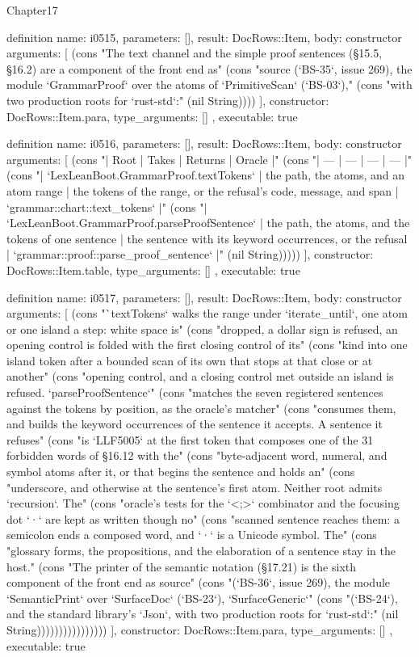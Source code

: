 \begin{lexlean}{Chapter17}
\begin{semanticmodule}
definition{
  name: i0515,
  parameters: [],
  result: DocRows::Item,
  body: constructor{
    arguments: [
      (cons "The text channel and the simple proof sentences (§15.5, §16.2) are a component of the front end as" (cons "source (`BS-35`, issue 269), the module `GrammarProof` over the atoms of `PrimitiveScan` (`BS-03`)," (cons "with two production roots for `rust-std`:" (nil String))))
    ],
    constructor: DocRows::Item.para,
    type_arguments: []
  },
  executable: true
}

definition{
  name: i0516,
  parameters: [],
  result: DocRows::Item,
  body: constructor{
    arguments: [
      (cons "| Root | Takes | Returns | Oracle |" (cons "| --- | --- | --- | --- |" (cons "| `LexLeanBoot.GrammarProof.textTokens` | the path, the atoms, and an atom range | the tokens of the range, or the refusal's code, message, and span | `grammar::chart::text_tokens` |" (cons "| `LexLeanBoot.GrammarProof.parseProofSentence` | the path, the atoms, and the tokens of one sentence | the sentence with its keyword occurrences, or the refusal | `grammar::proof::parse_proof_sentence` |" (nil String)))))
    ],
    constructor: DocRows::Item.table,
    type_arguments: []
  },
  executable: true
}

definition{
  name: i0517,
  parameters: [],
  result: DocRows::Item,
  body: constructor{
    arguments: [
      (cons "`textTokens` walks the range under `iterate_until`, one atom or one island a step: white space is" (cons "dropped, a dollar sign is refused, an opening control is folded with the first closing control of its" (cons "kind into one island token after a bounded scan of its own that stops at that close or at another" (cons "opening control, and a closing control met outside an island is refused. `parseProofSentence`" (cons "matches the seven registered sentences against the tokens by position, as the oracle's matcher" (cons "consumes them, and builds the keyword occurrences of the sentence it accepts. A sentence it refuses" (cons "is `LLF5005` at the first token that composes one of the 31 forbidden words of §16.12 with the" (cons "byte-adjacent word, numeral, and symbol atoms after it, or that begins the sentence and holds an" (cons "underscore, and otherwise at the sentence's first atom. Neither root admits `recursion`. The" (cons "oracle's tests for the `<;>` combinator and the focusing dot `·` are kept as written though no" (cons "scanned sentence reaches them: a semicolon ends a composed word, and `·` is a Unicode symbol. The" (cons "glossary forms, the propositions, and the elaboration of a sentence stay in the host." (cons "The printer of the semantic notation (§17.21) is the sixth component of the front end as source" (cons "(`BS-36`, issue 269), the module `SemanticPrint` over `SurfaceDoc` (`BS-23`), `SurfaceGeneric`" (cons "(`BS-24`), and the standard library's `Json`, with two production roots for `rust-std`:" (nil String))))))))))))))))
    ],
    constructor: DocRows::Item.para,
    type_arguments: []
  },
  executable: true
}


\end{semanticmodule}
\end{lexlean}
